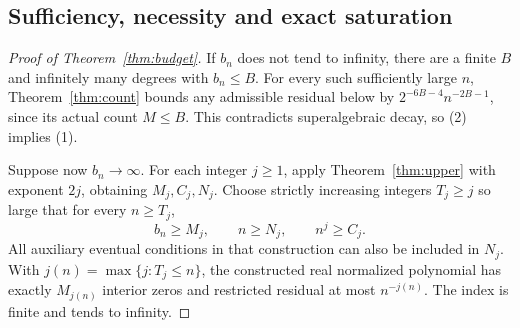 \documentclass[11pt]{article}
\theoremstyle{remark}\newtheorem{remark}[theorem]{Remark}
\begin{document}
\subsection{Sufficiency, necessity and exact saturation}
\begin{proof}[Proof of Theorem~\ref{thm:budget}]
If \(b_n\) does not tend to infinity, there are a finite \(B\)
and infinitely many degrees with \(b_n\le B\).
For every such sufficiently large \(n\), Theorem~\ref{thm:count}
bounds any admissible residual below by
\(2^{-6B-4}n^{-2B-1}\), since its actual count \(M\le B\).
This contradicts superalgebraic decay, so (2) implies (1).

Suppose now \(b_n\to\infty\). For each integer \(j\ge1\),
apply Theorem~\ref{thm:upper} with exponent \(2j\), obtaining
\(M_j,C_j,N_j\). Choose strictly increasing integers \(T_j\ge j\)
so large that for every \(n\ge T_j\),
\[
 b_n\ge M_j,\qquad n\ge N_j,\qquad n^j\ge C_j.
\]
All auxiliary eventual conditions in that construction can also be
included in \(N_j\). With \(j(n)=\max\{j:T_j\le n\}\), the
constructed real normalized polynomial has exactly \(M_{j(n)}\)
interior zeros and restricted residual at most \(n^{-j(n)}\).
The index is finite and tends to infinity.


\end{proof}
\end{document}
